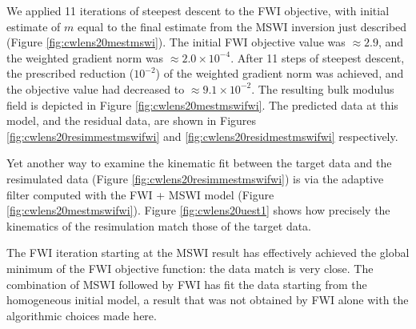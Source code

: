 We applied 11 iterations of steepest descent to the FWI objective,
with initial estimate of $m$ equal to the final estimate from the MSWI
inversion just described (Figure \ref{fig:cwlens20mestmswi}). The initial FWI
objective value was $\approx 2.9$, and the weighted gradient norm was
$\approx 2.0 \times 10^{-4}$.  After 11 steps of steepest descent,
the prescribed reduction ($10^{-2}$) of the weighted gradient norm was achieved,
and the objective value had decreased to $\approx 9.1 \times
10^{-2}$. The resulting bulk modulus field is depicted in Figure
\ref{fig:cwlens20mestmswifwi}. The predicted data at this model, and the residual
data, are shown in Figures \ref{fig:cwlens20resimmestmswifwi} and \ref{fig:cwlens20residmestmswifwi}
respectively.



Yet another way to examine the kinematic fit between the target data
and the resimulated data (Figure \ref{fig:cwlens20resimmestmswifwi})
is via the adaptive filter computed with the FWI + MSWI model (Figure
\ref{fig:cwlens20mestmswifwi}).  Figure \ref{fig:cwlens20uest1}
shows how precisely the kinematics of the resimulation match those of
the target data.


The FWI iteration starting at the MSWI result has effectively achieved
the global minimum of the FWI objective function: the data match is
very close. The combination of MSWI followed by FWI has fit the data
starting from the homogeneous initial model, a result that was not obtained
by FWI alone with the algorithmic choices made here.

